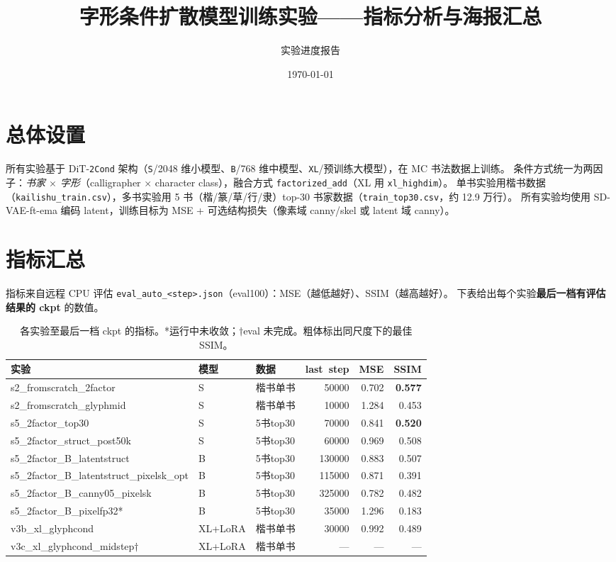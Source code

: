 \documentclass[11pt]{ctexart}
\title{\textbf{字形条件扩散模型训练实验——指标分析与海报汇总}}
\author{实验进度报告}
\date{\today}
\begin{document}
\maketitle

\section{总体设置}
所有实验基于 $\mathrm{DiT}$-\texttt{2Cond} 架构（\texttt{S}/2048 维小模型、\texttt{B}/768 维中模型、\texttt{XL}/预训练大模型），在 MC 书法数据上训练。
条件方式统一为两因子：\emph{书家 $\times$ 字形}（calligrapher $\times$ character class），融合方式 \texttt{factorized\_add}（XL 用 \texttt{xl\_highdim}）。
单书实验用楷书数据（\texttt{kailishu\_train.csv}），多书实验用 5 书（楷/篆/草/行/隶）top-30 书家数据（\texttt{train\_top30.csv}，约 12.9 万行）。
所有实验均使用 SD-VAE-ft-ema 编码 latent，训练目标为 MSE + 可选结构损失（像素域 canny/skel 或 latent 域 canny）。

\section{指标汇总}
指标来自远程 CPU 评估 \texttt{eval\_auto\_<step>.json}（eval100）：MSE（越低越好）、SSIM（越高越好）。
下表给出每个实验\textbf{最后一档有评估结果的 ckpt} 的数值。

\begin{table}[ht]
\centering
\small
\begin{tabular}{@{}lllrrr@{}}
\toprule
实验 & 模型 & 数据 & last~step & MSE & SSIM \\
\midrule
s2\_fromscratch\_2factor & S & 楷书单书 & 50000 & 0.702 & \textbf{0.577}\\
s2\_fromscratch\_glyphmid & S & 楷书单书 & 10000 & 1.284 & 0.453\\
s5\_2factor\_top30 & S & 5书top30 & 70000 & 0.841 & \textbf{0.520}\\
s5\_2factor\_struct\_post50k & S & 5书top30 & 60000 & 0.969 & 0.508\\
s5\_2factor\_B\_latentstruct & B & 5书top30 & 130000 & 0.883 & 0.507\\
s5\_2factor\_B\_latentstruct\_pixelsk\_opt & B & 5书top30 & 115000 & 0.871 & 0.391\\
s5\_2factor\_B\_canny05\_pixelsk & B & 5书top30 & 325000 & 0.782 & 0.482\\
s5\_2factor\_B\_pixelfp32* & B & 5书top30 & 35000 & 1.296 & 0.183\\
v3b\_xl\_glyphcond & XL+LoRA & 楷书单书 & 30000 & 0.992 & 0.489\\
v3c\_xl\_glyphcond\_midstep$\dagger$ & XL+LoRA & 楷书单书 & --- & --- & ---\\
\bottomrule
\end{tabular}
\caption{各实验至最后一档 ckpt 的指标。*运行中未收敛；$\dagger$eval 未完成。粗体标出同尺度下的最佳 SSIM。}
\end{table}
\end{document}
